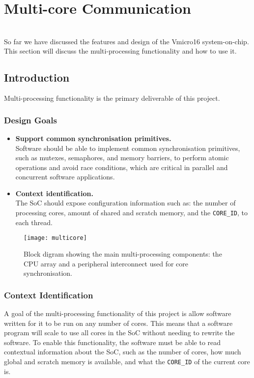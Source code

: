 
\chapter{Multi-core Communication}
\startcontents[chapters]

\noindent\\
So far we have discussed the features and design of the Vmicro16 system-on-chip. This section will discuss the multi-processing functionality and how to use it.

\section{Introduction}
Multi-processing functionality is the primary deliverable of this project.

\subsection{Design Goals}
\begin{itemize}
\item \textbf{Support common synchronisation primitives.}\\
Software should be able to implement common synchronisation primitives, such as mutexes, semaphores, and memory barriers, to perform atomic operations and avoid race conditions, which are critical in parallel and concurrent software applications.

\item \textbf{Context identification.}\\
The SoC should expose configuration information such as: the number of processing cores, amount of shared and scratch memory, and the \verb|CORE_ID|, to each thread.

\end{itemize}


\begin{figure}[h]
\centering
\texttt{[image: multicore]}
\caption{Block digram showing the main multi-processing components: the CPU array and a peripheral interconnect used for core synchronisation.}
\label{fig:multicore}
\end{figure}

\subsection{Context Identification}
A goal of the multi-processing functionality of this project is allow software written for it to be run on any number of cores. This means that a software program will scale to use all cores in the SoC without needing to rewrite the software. To enable this functionality, the software must be able to read contextual information about the SoC, such as the number of cores, how much global and scratch memory is available, and what the \verb|CORE_ID| of the current core is. 

